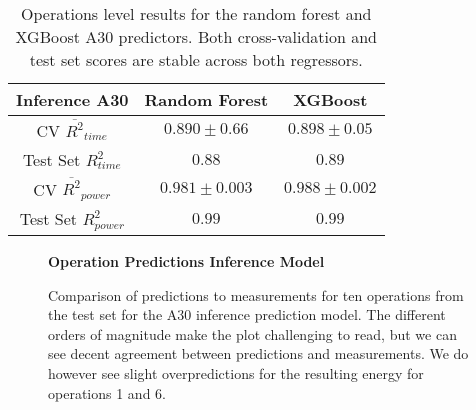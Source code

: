 \begin{table}[h!]
\centering
\begin{tabular}{|c|c|c|}
\hline
 \textbf{Inference A30}& \textbf{Random Forest} & \textbf{XGBoost} \\
\hline
CV $\overline{R^2}_{time}$ & $0.890 \pm 0.66$ &  $0.898 \pm 0.05$ \\
\hline
Test Set $R^2_{time}$ & $0.88$ & $0.89$ \\
\hline
CV $\overline{R^2}_{power}$ & $0.981 \pm 0.003$  &  $0.988 \pm 0.002$\\
\hline
Test Set $R^2_{power}$ & $0.99$ & $0.99$ \\
\hline
\end{tabular}
\caption{Operations level results for the random forest and XGBoost A30 predictors. Both cross-validation and test set scores are stable across both regressors.}
\label{tab:pred_res_inf}
\end{table}




\begin{figure}[htbp]
    \centering
    \parbox{1.1\textwidth}{\centering\textbf{Operation Predictions Inference Model}}
    \caption{Comparison of predictions to measurements for ten operations from the test set for the A30 inference prediction model. The different orders of magnitude make the plot challenging to read, but we can see decent agreement between predictions and measurements. We do however see slight overpredictions for the resulting energy for operations 1 and 6.}
    \label{fig:testsetops_inf}
\end{figure}


